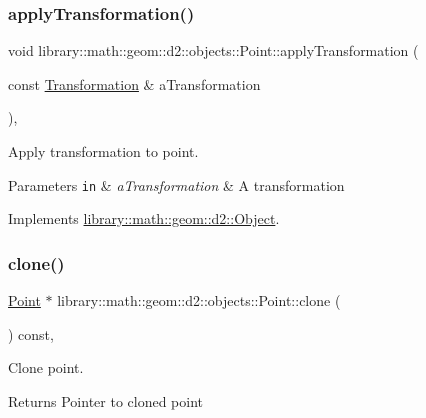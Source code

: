 \subsubsection{\texorpdfstring{apply\+Transformation()}{applyTransformation()}}
{\footnotesize\ttfamily void library\+::math\+::geom\+::d2\+::objects\+::\+Point\+::apply\+Transformation (\begin{DoxyParamCaption}\item[{const \hyperlink{classlibrary_1_1math_1_1geom_1_1d2_1_1_transformation}{Transformation} \&}]{a\+Transformation }\end{DoxyParamCaption})\hspace{0.3cm}{\ttfamily [override]}, {\ttfamily [virtual]}}



Apply transformation to point. 


\begin{DoxyParams}[1]{Parameters}
\mbox{\tt in}  & {\em a\+Transformation} & A transformation \\
\hline
\end{DoxyParams}


Implements \hyperlink{classlibrary_1_1math_1_1geom_1_1d2_1_1_object_a289589fb6e9e7a2c4ca4976a1544def5}{library\+::math\+::geom\+::d2\+::\+Object}.

\mbox{\label{classlibrary_1_1math_1_1geom_1_1d2_1_1objects_1_1_point_aa6b55bdbf5a0ce9ec8bc91ca79de3569}} 
\subsubsection{\texorpdfstring{clone()}{clone()}}
{\footnotesize\ttfamily \hyperlink{classlibrary_1_1math_1_1geom_1_1d2_1_1objects_1_1_point}{Point} $\ast$ library\+::math\+::geom\+::d2\+::objects\+::\+Point\+::clone (\begin{DoxyParamCaption}{ }\end{DoxyParamCaption}) const\hspace{0.3cm}{\ttfamily [override]}, {\ttfamily [virtual]}}



Clone point. 

\begin{DoxyReturn}{Returns}
Pointer to cloned point 
\end{DoxyReturn}


